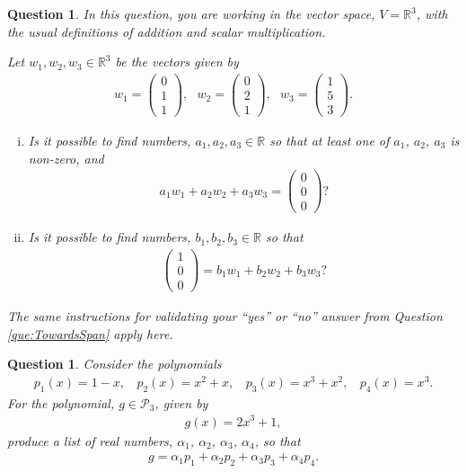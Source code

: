 \documentclass[12pt]{article}
\newtheorem{question}[thm]{Question}
\def\real{{\mathbb R}}
\def\al{\alpha}
\def\P{\mathcal P}
\newcommand{\ColVecThree}[3]{\begin{pmatrix} #1\\ #2\\ #3\end{pmatrix}}
\begin{document}
\vspace{0.4cm}



\begin{question}
	\normalfont
	
	
	In this question, you are working in the vector space, $V=\real^3$, with the usual definitions of addition and scalar multiplication.  
	
	Let $w_1, w_2, w_3\in\real^3$ be the vectors given by 
	\begin{align*}
		w_1 = \ColVecThree{0}{1}{1},\ \ \ w_2=\ColVecThree{0}{2}{1},\ \ \ 
		w_3 = \ColVecThree{1}{5}{3}.
	\end{align*}
	
	\begin{enumerate}[(i)]
		\item Is it possible to find numbers, $a_1,a_2,a_3\in\real$ so that at least one of $a_1$, $a_2$, $a_3$ is non-zero, and
		\begin{align*}
			a_1 w_1 + a_2 w_2 + a_3 w_3 = \ColVecThree{0}{0}{0}?
		\end{align*}
		
		\item Is it possible to find numbers, $b_1,b_2,b_3\in\real$ so that 
		\begin{align*}
			\ColVecThree{1}{0}{0} = b_1 w_1 + b_2 w_2 + b_3 w_3?
		\end{align*}

	\end{enumerate}
	
	
	The same instructions for validating your ``yes'' or ``no'' answer from Question \ref{que:TowardsSpan} apply here.
	

\end{question}



\vspace{0.4cm}




\begin{question}
	\normalfont

Consider the polynomials	\begin{align*}
		p_1(x) = 1-x,\ \ \ \ p_2(x)=x^2+x,\ \ \ \ p_3(x)=x^3+x^2,\ \ \ \ p_4(x)=x^3.
	\end{align*}
	For the polynomial, $g\in\P_3$, given by
	\begin{align*}
		g(x)=2x^3+1,
	\end{align*}
	produce a list of real numbers, $\al_1$, $\al_2$, $\al_3$, $\al_4$, so that
	\begin{align*}
		g = \al_1 p_1 + \al_2 p_2 + \al_3 p_3 + \al_4 p_4.
	\end{align*}

\end{question}
















\end{document}

